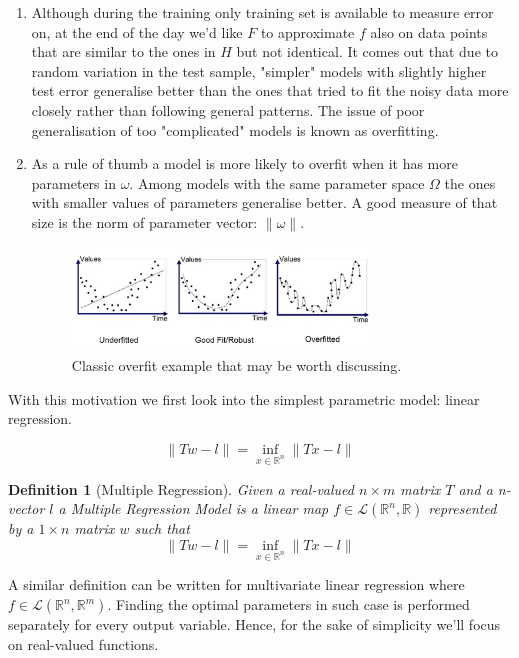 \documentclass[a4paper]{article}
\theoremstyle{break}
\newtheorem{definition}{Definition}[section]
\newcommand{\R}{\mathbb{R}}
\begin{document}
\begin{enumerate}
    \item Although during the training only training set is available to measure error on, at the end of the day we'd like $F$ to approximate $f$ also on data points that are similar to the ones in $H$ but not identical.
    It comes out that due to random variation in the test sample, "simpler" models with slightly higher test error generalise better than the ones that tried to fit the noisy data more closely rather than following general patterns. The issue of poor generalisation of too "complicated" models is known as overfitting.
    
    \item As a rule of thumb a model is more likely to overfit when it has more parameters in $ \omega $. Among models with the same parameter space $ \Omega $ the ones with smaller values of parameters generalise better. A good measure of that size is the norm of parameter vector: $ \| \omega \| $.
\begin{figure}[!htbp]
\begin{center}
    \includegraphics[width=8cm]{overfit_poly.png}
\end{center}
\caption{Classic overfit example that may be worth discussing.}\label{overfit}
\end{figure} 
    
\end{enumerate}

With this motivation we first look into the simplest parametric model: linear regression.

\begin{equation}
    \label{def}
        \| T w - l \| = \inf\limits_{x \in \R^n} \| T x - l \|
\end{equation}
    
\begin{definition}[Multiple Regression]
    Given a real-valued $ n \times m$ matrix $T$ and a n-vector $l$ a Multiple Regression Model is a linear map $f \in \mathcal{L} ( \R ^n, \R)$ represented by a $ 1 \times n$ matrix $w$ such that
    \begin{equation}\label{def2}
        \| T w - l \| = \inf\limits_{x \in \R^n} \| T x - l \|
    \end{equation}
\end{definition}
A similar definition can be written for multivariate linear regression where $ f \in \mathcal{L} ( \R ^n, \R^m)$. Finding the optimal parameters in such case is performed separately for every output variable. Hence, for the sake of simplicity we'll focus on real-valued functions.
\end{document}
